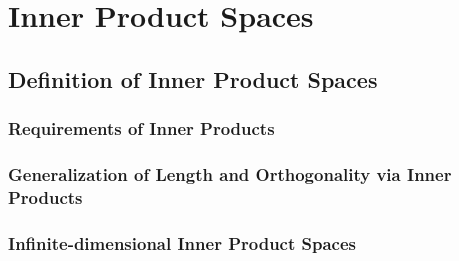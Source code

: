 \chapter{Inner Product Spaces}

\section{Definition of Inner Product Spaces}

\subsection{Requirements of Inner Products}

\subsection{Generalization of Length and Orthogonality via Inner Products}

\subsection{Infinite-dimensional Inner Product Spaces}